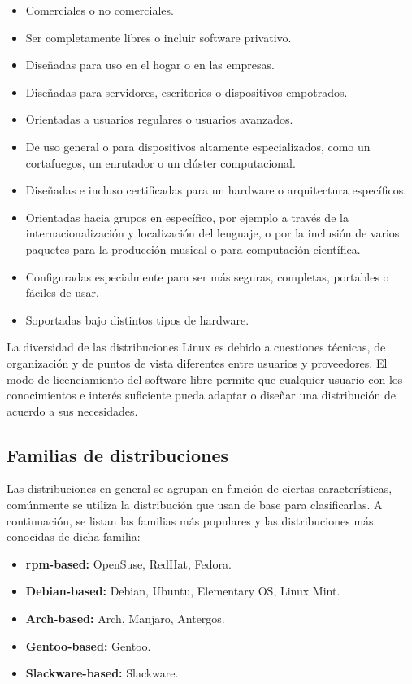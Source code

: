\begin{itemize}
	\item Comerciales o no comerciales.
	\item Ser completamente libres o incluir software privativo.
	\item Diseñadas para uso en el hogar o en las empresas.
	\item Diseñadas para servidores, escritorios o dispositivos empotrados.
	\item Orientadas a usuarios regulares o usuarios avanzados.
	\item De uso general o para dispositivos altamente especializados, como un cortafuegos, un enrutador o un clúster computacional.
	\item Diseñadas e incluso certificadas para un hardware o arquitectura específicos.
	\item Orientadas hacia grupos en específico, por ejemplo a través de la internacionalización y localización del lenguaje, o por la inclusión de varios paquetes para la producción musical o para computación científica.
	\item Configuradas especialmente para ser más seguras, completas, portables o fáciles de usar.
	\item Soportadas bajo distintos tipos de hardware.
\end{itemize}

La diversidad de las distribuciones Linux es debido a cuestiones técnicas, de organización y de puntos de vista diferentes entre usuarios y proveedores. El modo de licenciamiento del software libre permite que cualquier usuario con los conocimientos e interés suficiente pueda adaptar o diseñar una distribución de acuerdo a sus necesidades.

\subsection{Familias de distribuciones}
Las distribuciones en general se agrupan en función de ciertas características, comúnmente se utiliza la distribución que usan de base para clasificarlas. 
A continuación, se listan las familias más populares y las distribuciones más conocidas de dicha familia:

\begin{itemize}
	\item \textbf{rpm-based:} OpenSuse, RedHat, Fedora.
	\item \textbf{Debian-based:} Debian, Ubuntu, Elementary OS, Linux Mint.
	\item \textbf{Arch-based:} Arch, Manjaro, Antergos.
	\item \textbf{Gentoo-based:} Gentoo.
	\item \textbf{Slackware-based:} Slackware.
\end{itemize}

